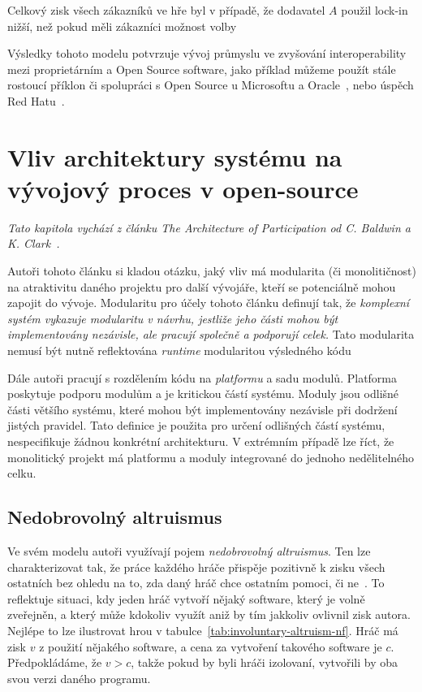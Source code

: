 \begin{multicols}{2}
	Celkový zisk všech zákazníků ve hře byl v případě, že dodavatel $A$ použil lock-in nižší, než pokud měli zákazníci možnost volby~\cite[kap. 5]{lock-in-competition}

	Výsledky tohoto modelu potvrzuje vývoj průmyslu ve zvyšování interoperability mezi proprietárním a Open Source software, jako příklad můžeme použít stále rostoucí příklon či spolupráci s Open Source u Microsoftu a Oracle~\cite[kap. 6]{lock-in-competition}, nebo úspěch Red Hatu~\cite{redhat-growth}.

\section{Vliv architektury systému na vývojový proces v open-source}
\label{ch:architecture-opensource}
	{\em Tato kapitola vychází z článku The Architecture of Participation od C. Baldwin a K. Clark~\cite{architecture-opensource}.}

	Autoři tohoto článku si kladou otázku, jaký vliv má modularita (či monolitičnost) na atraktivitu daného projektu pro další vývojáře, kteří se potenciálně mohou zapojit do vývoje. Modularitu pro účely tohoto článku definují tak, že {\em komplexní systém vykazuje modularitu v návrhu, jestliže jeho části mohou být implementovány nezávisle, ale pracují společně a podporují celek.} Tato modularita nemusí být nutně reflektována {\em runtime} modularitou výsledného kódu~\cite[kap. 2.1]{architecture-opensource}

	Dále autoři pracují s rozdělením kódu na {\em platformu} a sadu modulů. Platforma poskytuje podporu modulům a je kritickou částí systému. Moduly jsou odlišné části většího systému, které mohou být implementovány nezávisle při dodržení jistých pravidel. Tato definice je použita pro určení odlišných částí systému, nespecifikuje žádnou konkrétní architekturu. V extrémním případě lze říct, že monolitický projekt má platformu a moduly integrované do jednoho nedělitelného celku.

	\subsection*{Nedobrovolný altruismus}
		Ve svém modelu autoři využívají pojem {\em nedobrovolný altruismus}. Ten lze charakterizovat tak, že práce každého hráče přispěje pozitivně k zisku všech ostatních bez ohledu na to, zda daný hráč chce ostatním pomoci, či ne~\cite[kap. 3]{architecture-opensource}. To reflektuje situaci, kdy jeden hráč vytvoří nějaký software, který je volně zveřejněn, a který může kdokoliv využít aniž by tím jakkoliv ovlivnil zisk autora. Nejlépe to lze ilustrovat hrou v tabulce~\ref{tab:involuntary-altruism-nf}. Hráč má zisk $v$ z použití nějakého software, a cena za vytvoření takového software je $c$. Předpokládáme, že $v > c$, takže pokud by byli hráči izolovaní, vytvořili by oba svou verzi daného programu.


\end{multicols}
